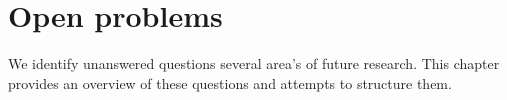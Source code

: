 \chapter{Open problems}
We identify unanswered questions several area's of future research. This chapter provides an overview of these questions and attempts to structure them.

